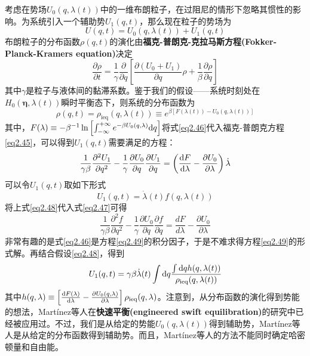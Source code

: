 \qquad 考虑在势场$U_0 (q, \lambda(t))$中的一维布朗粒子，在过阻尼的情形下忽略其惯性的影响。为系统引入一个辅助势$U_1 (q,t)$，那么现在粒子的势场为
\begin{equation}
    U (q,t) = U_0 (q, \lambda(t)) + U_1 (q,t)
    \label{eq2.44}
\end{equation}
布朗粒子的分布函数$\rho (q, t)$的演化由\textbf{福克-普朗克-克拉马斯方程(Fokker-Planck-Kramers equation)}\cite{Gardiner}决定
\begin{equation}
    \frac{\partial \rho}{\partial t}=\frac{1}{\gamma} \frac{\partial}{\partial q}\left[\frac{\partial\left(U_{0}+U_{1}\right)}{\partial q} \rho+\frac{1}{\beta} \frac{\partial \rho}{\partial q}\right]
    \label{eq2.45}
\end{equation}
其中$\gamma$是粒子与液体间的黏滞系数。鉴于我们的假设——系统时刻处在$H_0 (\bm{\eta}, \lambda(t))$瞬时平衡态下，则系统的分布函数为
\begin{equation}
    \rho(q, t)=\rho_{\mathrm{ieq}}(q, \lambda(t)) \equiv e^{\beta\left[F(\lambda(t))-U_{0}(q, \lambda(t))\right]}
    \label{eq2.46}
\end{equation}
其中，$F(\lambda) \equiv-\beta^{-1} \ln \left[\int_{-\infty}^{+\infty} e^{-\beta U_{0}(q, \lambda)} \mathrm{d} q \right]$将式\eqref{eq2.46}代入福克-普朗克方程\eqref{eq2.45}，可以得到$U_1 (q,t)$需要满足的方程：
\begin{equation}
    \frac{1}{\gamma \beta} \frac{\partial^{2} U_{1}}{\partial q^{2}}-\frac{1}{\gamma} \frac{\partial U_{0}}{\partial q} \frac{\partial U_{1}}{\partial q}=\left(\frac{\mathrm{d} F}{\mathrm{d} \lambda}-\frac{\partial U_{0}}{\partial \lambda}\right) \dot{\lambda}
    \label{eq2.47}
\end{equation}
可以令$ U_{1}(q, t)$取如下形式
\begin{equation}
    U_{1}(q, t)=\dot{\lambda}(t) f(q, \lambda(t))
    \label{eq2.48}
\end{equation}
将上式\eqref{eq2.48}代入式\eqref{eq2.47}可得
\begin{equation}
    \frac{1}{\gamma \beta} \frac{\partial^{2} f}{\partial q^{2}}-\frac{1}{\gamma} \frac{\partial U_{0}}{\partial q} \frac{\partial f}{\partial q}=\frac{d F}{d \lambda}-\frac{\partial U_{0}}{\partial \lambda}
    \label{eq2.49}
\end{equation}
非常有趣的是式\eqref{eq2.46}是方程\eqref{eq2.49}的积分因子，于是不难求得方程\eqref{eq2.49}的形式解。再结合假设\eqref{eq2.48}，得到
\begin{equation}
    U_{1}(q, t)=\gamma \beta \dot{\lambda}(t) \int \mathrm{d} q \frac{\int \mathrm{d} q h(q, \lambda(t))}{\rho_{\mathrm{ieq}}(q, \lambda(t))}
    \label{eq2.50}
\end{equation}
其中$h(q, \lambda) \equiv\left[\frac{\mathrm{d} F(\lambda)}{\mathrm{d} \lambda}-\frac{\partial U_{0}(q, \lambda)}{\partial \lambda}\right] \rho_{\mathrm{ieq}}(q, \lambda)$。注意到，从分布函数的演化得到势能的想法，Martínez等人在\textbf{快速平衡(engineered swift equilibration)}的研究\cite{Martinez2016}中已经被应用过。不过，我们是从给定的势能$U_0 (q,\lambda(t))$得到辅助势，Martínez等人是从给定的分布函数得到辅助势。而且，Martínez等人的方法不能同时确定哈密顿量和自由能。

